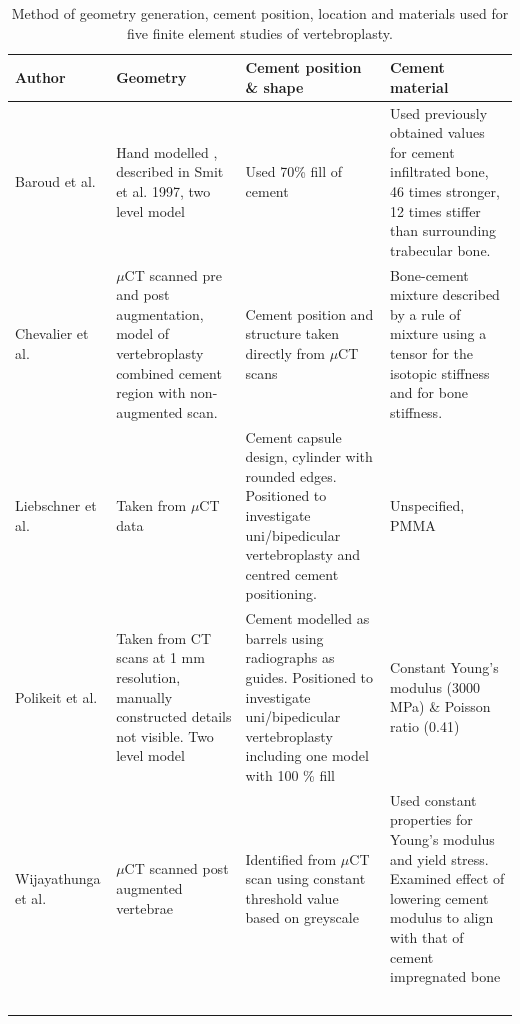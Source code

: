 \begin{landscape}

\begin{table}[ht!]
\caption{Method of geometry
generation, cement position, location and materials used for five finite
element studies of vertebroplasty.}
\label{tab:modVP}
\begin{tabular}{P{3cm}|P{6cm}|P{6cm}|P{6cm}}

Author & Geometry & Cement position \& shape & Cement
material\tabularnewline
\hline
\hline
Baroud et al. \cite{Baroud2003} & Hand modelled , described in Smit et al.
1997,
two level model & Used 70\% fill of cement & Used previously obtained
values for cement infiltrated bone, 46 times stronger, 12 times stiffer
than surrounding trabecular bone.\\
\hline
Chevalier et al. \cite{Chevalier2008} & $\mu$CT scanned pre and post
augmentation,
model
of vertebroplasty combined cement region with non-augmented scan. &
Cement position and structure taken directly from $\mu$CT scans &
Bone-cement mixture described by a rule of mixture using a tensor for
the isotopic stiffness and for bone stiffness.\\
\hline
Liebschner et al. \cite{Liebschner2001} & Taken from $\mu$CT data & Cement
capsule
design, cylinder with rounded edges. Positioned to investigate
uni/bipedicular vertebroplasty and centred cement positioning. &
Unspecified, PMMA\\
\hline
Polikeit et al. \cite{Polikeit2003} & Taken from CT scans at 1 mm resolution,
manually constructed details not visible. Two level model & Cement
modelled as barrels using radiographs as guides. Positioned to
investigate uni/bipedicular vertebroplasty including one model with 100
\% fill & Constant Young's modulus (3000 MPa) \& Poisson ratio
(0.41)\\
\hline
Wijayathunga et al.\cite{Wijayathunga2008} & $\mu$CT scanned post augmented
vertebrae &
Identified from $\mu$CT scan using constant threshold value based on
greyscale & Used constant properties for Young's modulus and yield
stress. Examined effect of lowering cement modulus to align with that of
cement impregnated bone\tabularnewline
\
\end{tabular}
\end{table}

\end{landscape}

